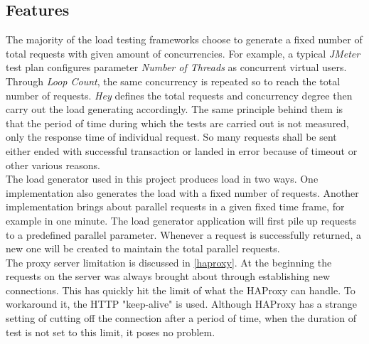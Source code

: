 \subsection{Features}
\label{load generator}
The majority of the load testing frameworks choose to generate a fixed number of total requests with given amount of concurrencies.  For example, a typical \textit{JMeter} test plan configures parameter \textit{Number of Threads} as concurrent virtual users. Through \textit{Loop Count}, the same concurrency is repeated so to reach the total number of requests. \textit{Hey} defines the total requests and concurrency degree then carry out the load generating accordingly. The same principle behind them is that the period of time during which the tests are carried out is not measured, only the response time of individual request. So many requests shall be sent either ended with successful transaction or landed in error because of timeout or other various reasons. \\
The load generator used in this project produces load in two ways. One implementation also generates the load with a fixed number of requests. Another implementation brings about parallel requests in a given fixed time frame, for example in one minute. The load generator application will first pile up requests to a predefined parallel parameter. Whenever a request is successfully returned, a new one will be created to maintain the total parallel requests.\\

The proxy server limitation is discussed in \ref{haproxy}. At the beginning the requests on the server was always brought about through establishing new connections. This has quickly hit the limit of what the HAProxy can handle. To workaround it, the HTTP "keep-alive" is used. Although HAProxy has a strange setting of cutting off the connection after a period of time, when the duration of test is not set to this limit, it poses no problem. 

